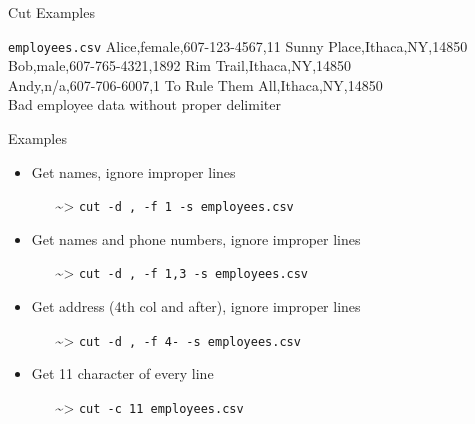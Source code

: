 \begin{frame}[fragile]{Cut Examples}
  \begin{block}{\texttt{employees.csv}}
    {\footnotesize\ttfamily
    Alice,female,607-123-4567,11 Sunny Place,Ithaca,NY,14850\\
    Bob,male,607-765-4321,1892 Rim Trail,Ithaca,NY,14850\\
    Andy,n/a,607-706-6007,1 To Rule Them All,Ithaca,NY,14850\\
    Bad employee data without proper delimiter
    }
  \end{block}
  \vspace*{-1ex}
  \begin{block}{Examples}
    \begin{itemize}
      \item Get names, ignore improper lines
      \begin{itemize}
        \item[\textasciitilde>] \texttt{cut -d , -f 1 -s employees.csv}
      \end{itemize}
      \item Get names and phone numbers, ignore improper lines
      \begin{itemize}
        \item[\textasciitilde>] \texttt{cut -d , -f 1,3 -s employees.csv}
      \end{itemize}
      \item Get address (4th col and after), ignore improper lines
      \begin{itemize}
        \item[\textasciitilde>] \texttt{cut -d , -f 4- -s employees.csv}
      \end{itemize}
      \item Get 11 character of every line
      \begin{itemize}
        \item[\textasciitilde>] \texttt{cut -c 11 employees.csv}
      \end{itemize}
    \end{itemize}
  \end{block}
\end{frame}

